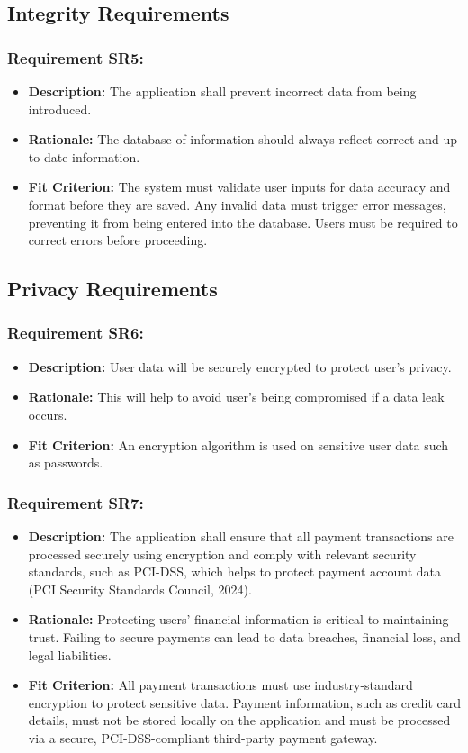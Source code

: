 \documentclass[12pt]{article}
\begin{document}
\subsection{Integrity Requirements}
\subsubsection*{Requirement SR5:}
\begin{itemize}
  \item \textbf{Description:} The application shall prevent incorrect data from being introduced.
  \item \textbf{Rationale:} The database of information should always reflect correct and up to date information.
  \item \textbf{Fit Criterion:} The system must validate user inputs for data accuracy and format before they are saved. Any invalid data must trigger error messages, preventing it from being entered into the database. Users must be required to correct errors before proceeding.
\end{itemize}
\subsection{Privacy Requirements}
\subsubsection*{Requirement SR6:}
\begin{itemize}
  \item \textbf{Description:} User data will be securely encrypted to protect user’s privacy.
  \item \textbf{Rationale:} This will help to avoid user's being compromised if a data leak occurs.
  \item \textbf{Fit Criterion:} An encryption algorithm is used on sensitive user data such as passwords.
\end{itemize}
\subsubsection*{Requirement SR7:}
\begin{itemize}
  \item \textbf{Description:} The application shall ensure that all payment transactions are processed securely using encryption and comply with relevant security standards, such as PCI-DSS, which helps to protect payment account data (PCI Security Standards Council, 2024).
  \item \textbf{Rationale:} Protecting users' financial information is critical to maintaining trust. Failing to secure payments can lead to data breaches, financial loss, and legal liabilities.
  \item \textbf{Fit Criterion:} All payment transactions must use industry-standard encryption to protect sensitive data. Payment information, such as credit card details, must not be stored locally on the application and must be processed via a secure, PCI-DSS-compliant third-party payment gateway.
\end{itemize}
\end{document}

